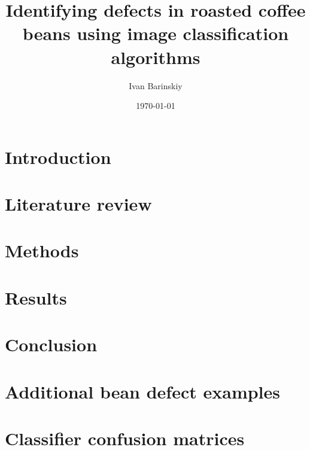 \documentclass{./template/UoYCSproject}
\author{Ivan Barinskiy}
\date{\today}
\title{Identifying defects in roasted coffee beans using image classification algorithms}
\begin{document}
	\maketitle

	\listoffigures
	\listoftables

	\begin{summary}
		
	\end{summary}

	\chapter{Introduction}
	\label{ch:introduction}
	

	\chapter{Literature review}
	\label{ch:litreview}
	

	\chapter{Methods}
	\label{ch:methods}
	

	\chapter{Results}
	\label{ch:results}
    

	\chapter{Conclusion}
	\label{ch:conclusion}
	

	\appendix
	\chapter{Additional bean defect examples}
	\label{ch:appendix1}
	
	\chapter{Classifier confusion matrices}
	\label{ch:appendix2}
	

	\printbibliography
\end{document}
